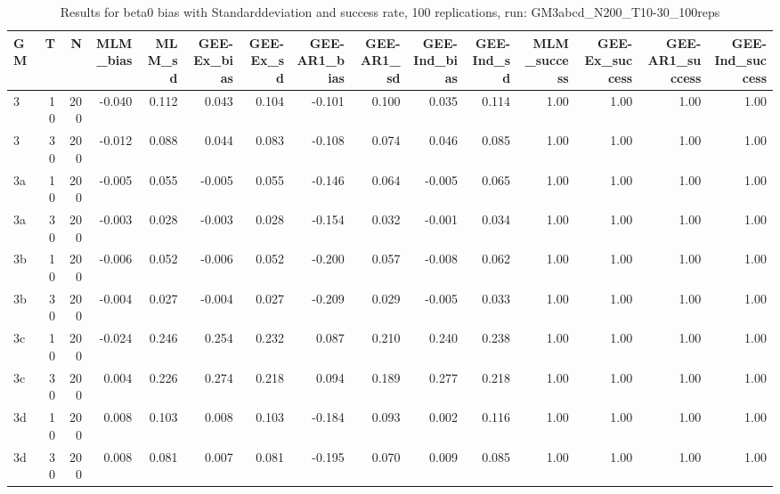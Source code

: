 \begin{table}[ht]
\centering
\begin{tabular}{lrrrrrrrrrrrrrr}
  \hline
GM & T & N & MLM\_bias & MLM\_sd & GEE-Ex\_bias & GEE-Ex\_sd & GEE-AR1\_bias & GEE-AR1\_sd & GEE-Ind\_bias & GEE-Ind\_sd & MLM\_success & GEE-Ex\_success & GEE-AR1\_success & GEE-Ind\_success \\ 
  \hline
3 & 10 & 200 & -0.040 & 0.112 & 0.043 & 0.104 & -0.101 & 0.100 & 0.035 & 0.114 & 1.00 & 1.00 & 1.00 & 1.00 \\ 
  3 & 30 & 200 & -0.012 & 0.088 & 0.044 & 0.083 & -0.108 & 0.074 & 0.046 & 0.085 & 1.00 & 1.00 & 1.00 & 1.00 \\ 
  3a & 10 & 200 & -0.005 & 0.055 & -0.005 & 0.055 & -0.146 & 0.064 & -0.005 & 0.065 & 1.00 & 1.00 & 1.00 & 1.00 \\ 
  3a & 30 & 200 & -0.003 & 0.028 & -0.003 & 0.028 & -0.154 & 0.032 & -0.001 & 0.034 & 1.00 & 1.00 & 1.00 & 1.00 \\ 
  3b & 10 & 200 & -0.006 & 0.052 & -0.006 & 0.052 & -0.200 & 0.057 & -0.008 & 0.062 & 1.00 & 1.00 & 1.00 & 1.00 \\ 
  3b & 30 & 200 & -0.004 & 0.027 & -0.004 & 0.027 & -0.209 & 0.029 & -0.005 & 0.033 & 1.00 & 1.00 & 1.00 & 1.00 \\ 
  3c & 10 & 200 & -0.024 & 0.246 & 0.254 & 0.232 & 0.087 & 0.210 & 0.240 & 0.238 & 1.00 & 1.00 & 1.00 & 1.00 \\ 
  3c & 30 & 200 & 0.004 & 0.226 & 0.274 & 0.218 & 0.094 & 0.189 & 0.277 & 0.218 & 1.00 & 1.00 & 1.00 & 1.00 \\ 
  3d & 10 & 200 & 0.008 & 0.103 & 0.008 & 0.103 & -0.184 & 0.093 & 0.002 & 0.116 & 1.00 & 1.00 & 1.00 & 1.00 \\ 
  3d & 30 & 200 & 0.008 & 0.081 & 0.007 & 0.081 & -0.195 & 0.070 & 0.009 & 0.085 & 1.00 & 1.00 & 1.00 & 1.00 \\ 
   \hline
\end{tabular}
\caption{Results for beta0 bias with Standarddeviation and success rate, 100 replications, run: GM3abcd_N200_T10-30_100reps} 
\label{tab:beta0_bias_sd_success}
\end{table}
